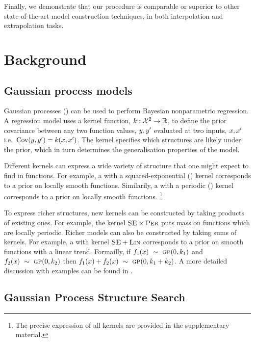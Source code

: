 \documentclass{article}
\def\ie{i.e.\ }
\begin{document}
Finally, we demonstrate that our procedure is comparable or superior to other state-of-the-art model construction techniques, in both interpolation and extrapolation tasks.

\section{Background}
\label{sec:gpss}

\subsection{Gaussian process models}

Gaussian processes (\gp{}) \citep{rasmussen38gaussian} can be used to perform Bayesian nonparametric regression.
A \gp{} regression model uses a kernel function, ${k : \mathcal{X}^2 \to \mathbb{R}}$, to define the prior covariance between any two function values, $y, y'$ evaluated at two inputs, $x,x'$ \ie ${\textrm{Cov}(y, y') = k(x,x')}$.
The kernel specifies which structures are likely under the \gp{} prior, which in turn determines the generalisation properties of the model.

Different kernels can express a wide variety of structure that one might expect to find in functions.
For example, a \gp{} with a squared-exponential (\kSE) kernel corresponds to a prior on locally smooth functions.
Similarily, a \gp{} with a periodic (\kPer) kernel corresponds to a prior on locally smooth functions. \footnote{The precise expression of all kernels are provided in the supplementary material.}

To express richer structures, new kernels can be constructed by taking products of existing ones.
For example, the kernel ${\textsc{SE}} \times {\textsc{Per}}$ puts mass on functions which are locally periodic.
Richer models can also be constructed by taking sums of kernels.  For example, a \gp{} with kernel ${\textsc{SE}} + {\textsc{Lin}}$ corresponds to a prior on smooth functions with a linear trend.
Formailly, if $f_1(x) \ \sim\  {\textsc{gp}}{}(0, k_1)$ and $f_2(x) \ \sim\  {\textsc{gp}}{}(0, k_2)$ then $f_1(x) + f_2(x) \ \sim\  {\textsc{gp}}{}(0, k_1 + k_2)$.
A more detailed discussion with examples can be found in \cite{DuvLloGroetal13}.

\subsection{Gaussian Process Structure Search}
\end{document}

